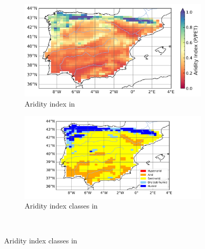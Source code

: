 \begin{figure}[htbp]
    \begin{subfigure}[b]{0.42\textwidth}
        \caption{Aridity index in \futnoirr}
        \includegraphics[width=\textwidth]{images/chap4/future/map_AI_fut_noirr.png}
    \end{subfigure}
    \begin{subfigure}[b]{0.48\textwidth}
        \caption{Aridity index classes in \futnoirr}
        \includegraphics[width=\textwidth]{images/chap4/future/aridity_index_fut_noirr.png}
    \end{subfigure} \\


\end{figure}
